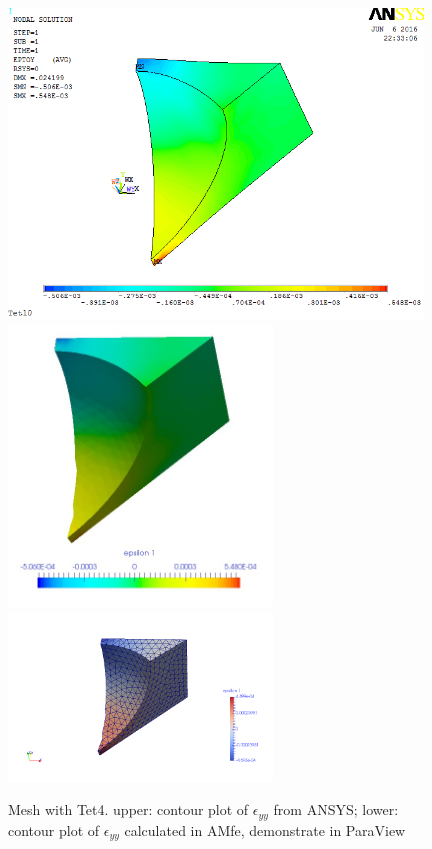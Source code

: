 \begin{figure}[htbp]
	\begin{center}
		\includegraphics[width=11cm,clip]{Tet4Eyy.png} 		
		\includegraphics[width=7cm,clip]{Tet4EyyPD.png} 
		\includegraphics[width=7cm,clip]{Tet4EyyP.png} 		
		\caption{Mesh with Tet4. upper: contour plot of $\epsilon_{yy}$ from ANSYS; lower: contour plot of $\epsilon_{yy}$ calculated in AMfe, demonstrate in ParaView} \label{fig: Tet4Eyy}
	\end{center}
\end{figure}
\clearpage 

